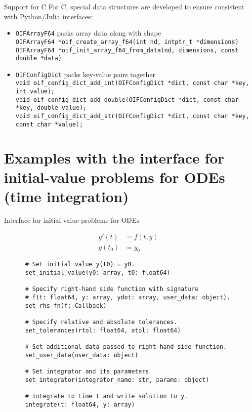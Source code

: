 \documentclass[10pt, aspectratio=169, progressbar=frametitle]{beamer}
\begin{document}
\begin{frame}{Support for C}
  \small For C, special data structures are developed to ensure consistent with Python/Julia interfaces:
  \begin{itemize}
    \item \texttt{OIFArrayF64} packs array data along with shape\\
          \texttt{OIFArrayF64 *oif\_create\_array\_f64(int nd, intptr\_t *dimensions)}\\
          \texttt{OIFArrayF64 *oif\_init\_array\_f64\_from\_data(nd, dimensions, const double *data)
}
      \item<2-> \texttt{OIFConfigDict} packs key-value pairs together\\
          \texttt{void oif\_config\_dict\_add\_int(OIFConfigDict *dict, const char *key, int value);}\\
          \texttt{void oif\_config\_dict\_add\_double(OIFConfigDict *dict, const char *key, double value);}\\
          \texttt{void oif\_config\_dict\_add\_str(OIFConfigDict *dict, const char *key, const char *value);}
  \end{itemize}
\end{frame}

\section{Examples with the interface for initial-value problems for ODEs (time integration)}

\begin{frame}[fragile]{Interface for initial-value problems for ODEs}
  \begin{minipage}{\dimexpr0.22\textwidth-2\tabcolsep}
    \begin{align*}
      y'(t)  & = f(t, y) \\
      y(t_0) & = y_0
    \end{align*}
  \end{minipage}
  \begin{minipage}{\dimexpr0.73\textwidth-2\tabcolsep}
    {\footnotesize
    \begin{verbatim}
      # Set initial value y(t0) = y0.
      set_initial_value(y0: array, t0: float64)

      # Specify right-hand side function with signature
      # f(t: float64, y: array, ydot: array, user_data: object).
      set_rhs_fn(f: Callback)

      # Specify relative and absolute tolerances.
      set_tolerances(rtol: float64, atol: float64)

      # Set additional data passed to right-hand side function.
      set_user_data(user_data: object)

      # Set integrator and its parameters
      set_integrator(integrator_name: str, params: object)

      # Integrate to time t and write solution to y.
      integrate(t: float64, y: array)
    \end{verbatim}
    }
  \end{minipage}
\end{frame}
\end{document}
